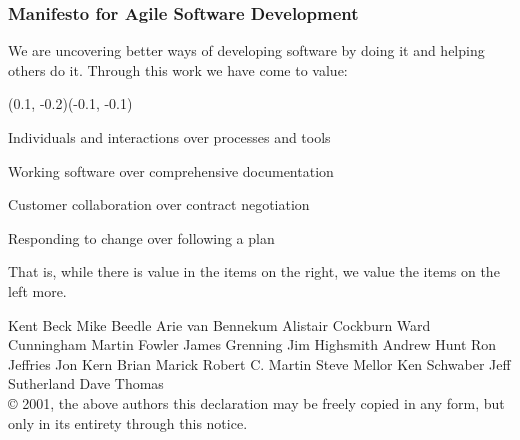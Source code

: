 

\begin{frame}
  \frametitle{Manifesto for Agile Software Development}

  {\footnotesize \color{black} We are uncovering better ways of developing
  software by doing it and helping others do it.
  Through this work we have come to value:}

  \vfill

  (0.1, -0.2)(-0.1, -0.1)
  \begin{description}
    \begin{small}
      \item [Individuals and interactions] over processes and tools
      \item [Working software] over comprehensive documentation
      \item [Customer collaboration] over contract negotiation
      \item [Responding to change] over following a plan
    \end{small}
  \end{description}

  \vfill

  {\footnotesize That is, while there is value in the items on
  the right, we value the items on the left more.}

  \begin{block}{}
    {\tiny
      Kent Beck\hspace{5pt}
      Mike Beedle\hspace{5pt}
      Arie van Bennekum\hspace{5pt}
      Alistair Cockburn\hspace{5pt}
      Ward Cunningham\hspace{5pt}
      Martin Fowler\hspace{5pt}
      James Grenning\hspace{5pt}
      Jim Highsmith\hspace{5pt}
      Andrew Hunt\hspace{5pt}
      Ron Jeffries\hspace{5pt}
      Jon Kern\hspace{5pt}
      Brian Marick\hspace{5pt}
      Robert C. Martin\hspace{5pt}
      Steve Mellor\hspace{5pt}
      Ken Schwaber\hspace{5pt}
      Jeff Sutherland\hspace{5pt}
      Dave Thomas\\
      © 2001, the above authors
      this declaration may be freely copied in any form, but only in its entirety through this notice.}
  \end{block}

\end{frame}


